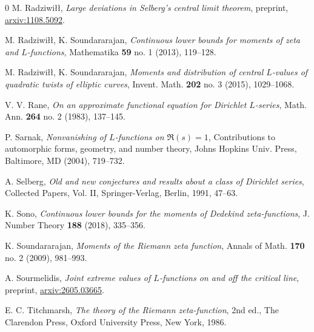 \documentclass[oneside, 12pt]{amsart}
\theoremstyle{definition}
\begin{document}
\begin{thebibliography}{0}
		 M. Radziwi\l\l, \emph{Large deviations in Selberg’s central limit theorem}, preprint, \href{https://arxiv.org/abs/1108.5092}{arxiv:1108.5092}. 
		
		 M. Radziwi\l\l, K. Soundararajan, \emph{Continuous lower bounds for moments of zeta and {$L$}-functions}, Mathematika {\bf 59} no. 1 (2013), 119--128.	
		
		 M. Radziwi\l\l, K. Soundararajan, \emph{Moments and distribution of central $L$-values of quadratic twists of elliptic curves}, Invent. Math. {\bf 202} no. 3 (2015), 1029--1068.
		
		 V. V. Rane, \emph{On an approximate functional equation for {D}irichlet {$L$}-series}, Math. Ann. {\bf 264} no. 2 (1983), 137--145.
		
		 P. Sarnak, \emph{Nonvanishing of {$L$}-functions on {$\mathfrak{R}(s)=1$}}, Contributions to automorphic forms, geometry, and number
		theory, Johns Hopkins Univ. Press, Baltimore, MD (2004), 719--732.
		
		 A. Selberg, \emph{Old and new conjectures and results about a class of {D}irichlet series}, Collected Papers, Vol. II, Springer-Verlag, Berlin, 1991, 47--63.
		
		 K. Sono, \emph{Continuous lower bounds for the moments of {D}edekind zeta-functions}, J. Number Theory {\bf 188} (2018), 335--356.
		
		 K. Soundararajan, \emph{Moments of the Riemann zeta function}, Annals of Math. {\bf 170} no. 2 (2009), 981--993. 
		
		 A. Sourmelidis, \emph{Joint extreme values of {$L$}-functions on and off the critical line}, preprint, \href{https://arxiv.org/abs/2605.03665}{arxiv:2605.03665}.
		
		 E. C. Titchmarsh, \emph{The theory of the {R}iemann zeta-function}, 2nd ed., The Clarendon Press, Oxford University Press, New York, 1986.
		
		
	\end{thebibliography}
\end{document}
